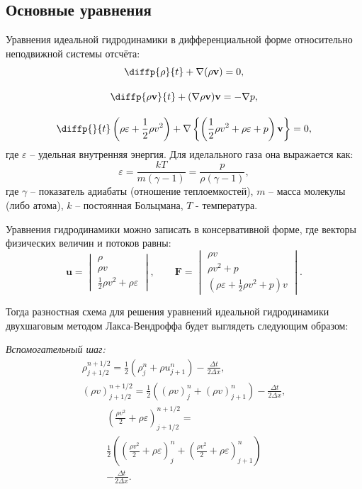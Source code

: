 \documentclass[a4paper]{article}
\begin{document}
	\subsection{Основные уравнения}
	Уравнения идеальной гидродинамики в дифференциальной форме относительно неподвижной системы отсчёта:
	\begin{gather}\label{eqHydro}
		\diffp{\rho}{t} + \nabla ( \rho \mathbf{v} ) = 0 ,	\\[10pt]
		\diffp{\rho \mathbf{v}}{t} + (\nabla \rho \mathbf{v}) \mathbf{v} = -\nabla p ,	\\[10pt]
		\diffp{}{t}\left(\rho \varepsilon + \frac{1}{2} \rho v^2 \right) + 
						\nabla \left\{ \left( \frac{1}{2} \rho v^2 + \rho \varepsilon + p \right)\mathbf{v}\right\} = 0 ,
	\end{gather}
	где $\varepsilon$ -- удельная внутренняя энергия. Для иделального газа она выражается как:
	\begin{equation}
		\varepsilon = \dfrac{kT}{m(\gamma-1)} = \dfrac{p}{\rho (\gamma - 1)} ,
	\end{equation}
	где $\gamma$ -- показатель адиабаты (отношение теплоемкостей), $m$ -- масса молекулы (либо атома), $k$ -- постоянная Больцмана, $T$ - температура. 

	Уравнения гидродинамики можно записать в консервативной форме,	
	где векторы физических величин и потоков равны:
	\begin{equation}
	\mathbf{u}	=	\begin{vmatrix}
						\rho								\\
						\rho v								\\
						\frac{1}{2}\rho v^2 + \rho \varepsilon		
					\end{vmatrix} , \qquad	
	\mathbf{F}	=	\begin{vmatrix}
						\rho v								\\
						\rho v^2 + p								\\
						\left(\rho \varepsilon + \frac{1}{2}\rho v^2 + p\right)v	
	\end{vmatrix}	.		
	\end{equation}
	
	Тогда разностная схема для решения уравнений идеальной гидродинамики двухшаговым методом Лакса-Вендроффа будет выглядеть следующим образом:
	
	\textit{Вспомогательный шаг:}
	\begin{gather}\label{HydroHelper}
	\rho_{j+1/2}^{n+1/2} = \frac{1}{2} \left(\rho_{j}^{n} + \rho{u}_{j+1}^{n}\right)
		- \frac{\Delta t}{2 \Delta x}	,	\\
	(\rho v)_{j+1/2}^{n+1/2} = \frac{1}{2} \left((\rho v)_{j}^{n} + (\rho v)_{j+1}^{n}\right)
	- \frac{\Delta t}{2 \Delta x}		,						
	\end{gather}
	\begin{multline}
		\left(\frac{\rho v^2}{2} + \rho \varepsilon	\right)_{j+1/2}^{n+1/2} = \\
		\frac{1}{2} \left(\left(\frac{\rho v^2}{2} + \rho \varepsilon	\right)_{j}^{n} 
		+ \left(\frac{\rho v^2}{2} + \rho \varepsilon	\right)_{j+1}^{n}\right) \\
		- \frac{\Delta t}{2 \Delta x}	.
	\end{multline}
	
\end{document}
